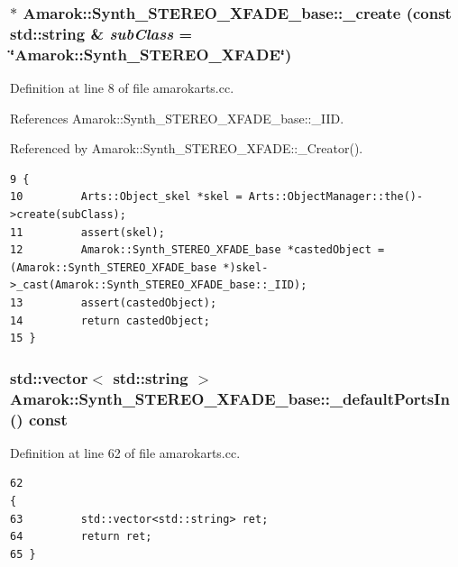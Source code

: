 \subsubsection{ $\ast$ Amarok::Synth\_\-STEREO\_\-XFADE\_\-base::\_\-create (const std::string \& {\em sub\-Class} = \char`\"{}Amarok::Synth\_\-STEREO\_\-XFADE\char`\"{})\hspace{0.3cm}{\tt  [static, inherited]}}\label{classAmarok_1_1Synth__STEREO__XFADE__base_Amarok_1_1Synth__STEREO__XFADE__stube0}




Definition at line 8 of file amarokarts.cc.

References Amarok::Synth\_\-STEREO\_\-XFADE\_\-base::\_\-IID.

Referenced by Amarok::Synth\_\-STEREO\_\-XFADE::\_\-Creator().



\footnotesize\begin{verbatim}9 {
10         Arts::Object_skel *skel = Arts::ObjectManager::the()->create(subClass);
11         assert(skel);
12         Amarok::Synth_STEREO_XFADE_base *castedObject = (Amarok::Synth_STEREO_XFADE_base *)skel->_cast(Amarok::Synth_STEREO_XFADE_base::_IID);
13         assert(castedObject);
14         return castedObject;
15 }
\end{verbatim}\normalsize 
{}
\subsubsection{\setlength{\rightskip}{0pt plus 5cm}std::vector$<$ std::string $>$ Amarok::Synth\_\-STEREO\_\-XFADE\_\-base::\_\-default\-Ports\-In () const\hspace{0.3cm}{\tt  [virtual, inherited]}}\label{classAmarok_1_1Synth__STEREO__XFADE__base_Amarok_1_1Synth__STEREO__XFADE__stuba4}




Definition at line 62 of file amarokarts.cc.



\footnotesize\begin{verbatim}62                                                                           {
63         std::vector<std::string> ret;
64         return ret;
65 }
\end{verbatim}\normalsize 
{}
